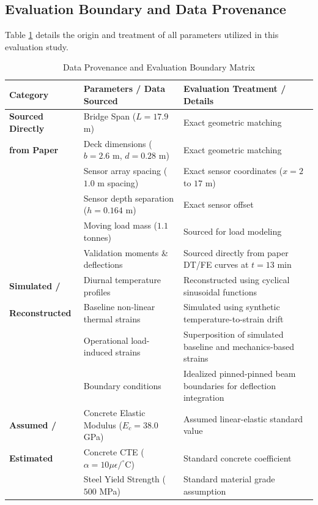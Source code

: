 \documentclass[11pt,journal,onecolumn]{IEEEtran}
\begin{document}
\subsection{Evaluation Boundary and Data Provenance}
Table \ref{tab:provenance} details the origin and treatment of all parameters utilized in this evaluation study.

\begin{table}[htbp]
\centering
\caption{Data Provenance and Evaluation Boundary Matrix}
\label{tab:provenance}
\begin{tabular}{lll}
\toprule
\textbf{Category} & \textbf{Parameters / Data Sourced} & \textbf{Evaluation Treatment / Details} \\
\midrule
\textbf{Sourced Directly} & Bridge Span ($L = 17.9$ m) & Exact geometric matching \\
\textbf{from Paper} \cite{hielscher2023neural} & Deck dimensions ($b = 2.6$ m, $d = 0.28$ m) & Exact geometric matching \\
& Sensor array spacing ($1.0$ m spacing) & Exact sensor coordinates ($x = 2$ to $17$ m) \\
& Sensor depth separation ($h = 0.164$ m) & Exact sensor offset \\
& Moving load mass ($1.1$ tonnes) & Sourced for load modeling \\
& Validation moments \& deflections & Sourced directly from paper DT/FE curves at $t=13$ min \\
\midrule
\textbf{Simulated /} & Diurnal temperature profiles & Reconstructed using cyclical sinusoidal functions \\
\textbf{Reconstructed} & Baseline non-linear thermal strains & Simulated using synthetic temperature-to-strain drift \\
& Operational load-induced strains & Superposition of simulated baseline and mechanics-based strains \\
& Boundary conditions & Idealized pinned-pinned beam boundaries for deflection integration \\
\midrule
\textbf{Assumed /} & Concrete Elastic Modulus ($E_c = 38.0$ GPa) & Assumed linear-elastic standard value \\
\textbf{Estimated} & Concrete CTE ($\alpha = 10 \mu\epsilon/^\circ\text{C}$) & Standard concrete coefficient \\
& Steel Yield Strength ($500$ MPa) & Standard material grade assumption \\
\bottomrule
\end{tabular}
\end{table}
\end{document}
